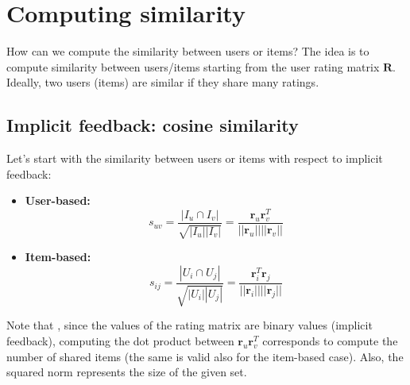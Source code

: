 \section{Computing similarity}
How can we compute the similarity between users or items? The idea is to compute similarity between users/items starting from the user rating matrix $\textbf{R}$. Ideally, two users (items) are similar if they share many ratings.
\subsection{Implicit feedback: cosine similarity}
Let's start with the similarity between users or items with respect to implicit feedback:
\begin{itemize}
    \item \textbf{User-based:}
    \[s_{uv} = \frac{|I_{u} \cap I_{v}|}{\sqrt{|I_{u}| |I_{v}|}} = \frac{\textbf{r}_{u} \textbf{r}_{v}^{T}}{||\textbf{r}_{u}|| ||\textbf{r}_{v}||}\]

    \item \textbf{Item-based:}
    \[s_{ij} = \frac{|U_{i} \cap U_{j}|}{\sqrt{|U_{i}| |U_{j}|}} = \frac{\textbf{r}_{i}^{T} \textbf{r}_{j}}{||\textbf{r}_{i}|| ||\textbf{r}_{j}||}\]
\end{itemize}
Note that , since the values of the rating matrix are binary values (implicit feedback), computing the dot product between $\textbf{r}_{u} \textbf{r}_{v}^{T}$ corresponds to compute the number of shared items (the same is valid also for the item-based case). Also, the squared norm represents the size of the given set.
